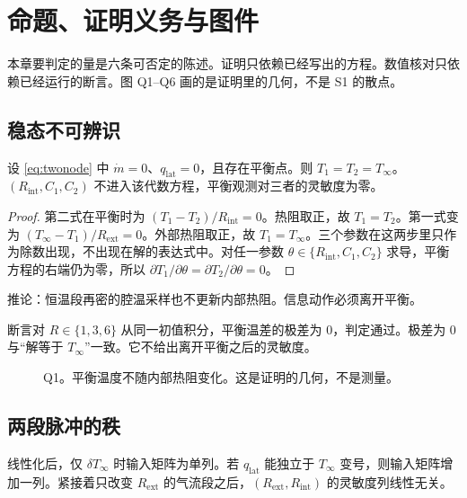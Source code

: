 \chapter{命题、证明义务与图件}
\label{ch:proof}

本章要判定的量是六条可否定的陈述。证明只依赖已经写出的方程。数值核对只依赖已经运行的断言。图 Q1--Q6 画的是证明里的几何，不是 S1 的散点。

\section{稳态不可辨识}

\begin{proposition}[平衡点不含内部参数]
\label{prop:steady}
设 \eqref{eq:twonode} 中 \(\dot m=0\)、\(q_{\mathrm{lat}}=0\)，且存在平衡点。则 \(T_1=T_2=T_\infty\)。\((R_{\mathrm{int}},C_1,C_2)\) 不进入该代数方程，平衡观测对三者的灵敏度为零。
\end{proposition}

\begin{proof}
第二式在平衡时为 \((T_1-T_2)/R_{\mathrm{int}}=0\)。热阻取正，故 \(T_1=T_2\)。第一式变为 \((T_\infty-T_1)/R_{\mathrm{ext}}=0\)。外部热阻取正，故 \(T_1=T_\infty\)。三个参数在这两步里只作为除数出现，不出现在解的表达式中。对任一参数 \(\theta\in\{R_{\mathrm{int}},C_1,C_2\}\) 求导，平衡方程的右端仍为零，所以 \(\partial T_1/\partial\theta=\partial T_2/\partial\theta=0\)。
\end{proof}

推论：恒温段再密的腔温采样也不更新内部热阻。信息动作必须离开平衡。

断言对 \(R\in\{1,3,6\}\) 从同一初值积分，平衡温差的极差为 0，判定通过。极差为 0 与“解等于 \(T_\infty\)”一致。它不给出离开平衡之后的灵敏度。

\begin{figure}[ht]
\centering
{}
\caption{Q1。平衡温度不随内部热阻变化。这是证明的几何，不是测量。}
\end{figure}

\section{两段脉冲的秩}

\begin{proposition}[第二输入方向]
\label{prop:pulse}
线性化后，仅 \(\delta T_\infty\) 时输入矩阵为单列。若 \(q_{\mathrm{lat}}\) 能独立于 \(T_\infty\) 变号，则输入矩阵增加一列。紧接着只改变 \(R_{\mathrm{ext}}\) 的气流段之后，\((R_{\mathrm{ext}},R_{\mathrm{int}})\) 的灵敏度列线性无关。
\end{proposition}

